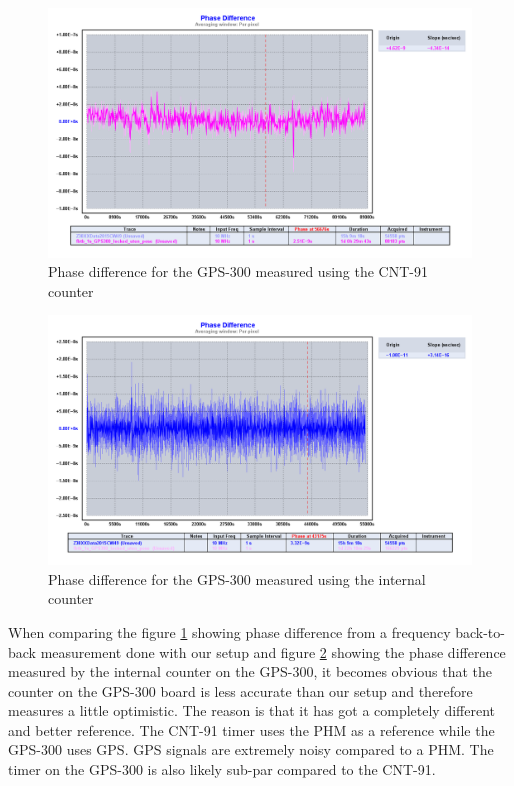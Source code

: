 \documentclass[11pt,english,a4paper]{article}
\begin{document}
\begin{figure}[!htb]
  \centering
    \includegraphics[width=1\textwidth]{part1_spm3_fbtb_phase_diff.png}
      \caption{Phase difference for the GPS-300 measured using the CNT-91 counter}
          \label{fig:part1_spm3_fbtb_phase_diff}
\end{figure}

\begin{figure}[!htb]
  \centering
    \includegraphics[width=1\textwidth]{part1_spm3_x38_phase_diff.png}
      \caption{Phase difference for the GPS-300 measured using the internal counter}
          \label{fig:part1_spm3_x38_phase_diff}
\end{figure}

When comparing the figure \ref{fig:part1_spm3_fbtb_phase_diff} showing phase difference from a frequency back-to-back  measurement done with our setup and figure \ref{fig:part1_spm3_x38_phase_diff} showing the phase difference measured by the internal counter on the GPS-300, it becomes obvious that the counter on the GPS-300 board is less accurate than our setup and therefore measures a little optimistic. The reason is that it has got a completely different and better reference. The CNT-91 timer uses the PHM as a reference while the GPS-300 uses GPS. GPS signals are extremely noisy compared to a PHM. The timer on the GPS-300 is also likely sub-par compared to the CNT-91. 
\end{document}
